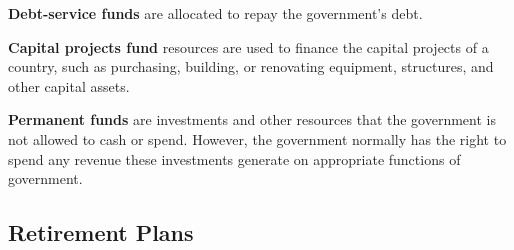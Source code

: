 \documentclass{article}
\begin{document}
      \begin{definition}
        \label{def:debt-service-funds}
      \textbf{Debt-service funds} are allocated to repay the government's debt. 
      \end{definition}

      \begin{definition}
        \label{def:capital-projects-funds}
      \textbf{Capital projects fund} resources are used to finance the capital projects of a country, such as purchasing, building, or renovating equipment, structures, and other capital assets. 
      \end{definition}

      \begin{definition}
        \label{def:permanent-funds}
      \textbf{Permanent funds} are investments and other resources that the government is not allowed to cash or spend. However, the government normally has the right to spend any revenue these investments generate on appropriate functions of government.
      \end{definition}

  \subsection{Retirement Plans}
\end{document}
